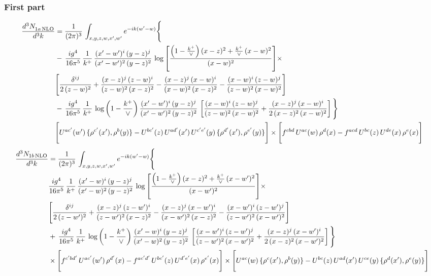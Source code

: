 \documentclass[9pt]{article}
\numberwithin{equation}{section}
\begin{document}
\subsubsection{First part}
\begin{align}
 \frac{d^{3}N_{1a\,\rm NLO}^{\rm}}{d^{3}k}  & =     \frac{1}{(2\pi)^{3}}\,\int_{x,y,z,w,x',w^{\prime}} e^{-ik(w^{\prime}-w)}\Bigg\{\notag \\
& -\, \frac{ig^{4}}{16\pi^{5}}\,\frac{1}{k^{+}}\, \frac{(x'-w')^{i}\,(y-z)^{j}}{(x'-w')^{2}\,(y-z)^{2}}\,\log{\left[\frac{\left(1-\frac{k^{+}}{\vee}\right)(x-z)^{2}+\frac{k^{+}}{\vee}\,(x-w)^{2}}{(x-w)^{2}}\right]}\times\notag \\ &  \Bigg[\frac{\delta^{ij}}{2\,(z-w)^{2}}+\frac{(x-z)^{j}\,(z-w)^{i}}{(z-w)^{2}\,(x-z)^{2}}-\frac{(x-z)^{j}\,(x-w)^{i}}{(x-w)^{2}\,(x-z)^{2}}-\frac{(x-w)^{i}\,(z-w)^{j}}{(z-w)^{2}\,(x-w)^{2}}\Bigg] \notag \\
& -\, \frac{ig^{4}}{16\pi^{5}}\,\frac{1}{k^{+}}\,\log{\left(1-\frac{k^{+}}{\vee}\right)}\,\frac{(x'-w')^{i}\,(y-z)^{j}}{(x'-w')^{2}\,(y-z)^{2}}\,\left[\frac{(x-w)^{i}\,(z-w)^{j}}{(z-w)^{2}\,(x-w)^{2}}+\frac{(x-z)^{j}\,(x-w)^{i}}{2\,(x-z)^{2}\, (x-w)^{2}}\right]\Bigg\} \notag \\ & \Bigg[U^{ac'}(w')\,\{\rho^{c'}(x'),\rho^{b}(y)\}-U^{bc'}(z)\,U^{ad'}(x')\,U^{c'e'}(y)\, \{\rho^{d'}(x'),\rho^{e'}(y)\}\Bigg]\times \Bigg[f^{cbd}\,U^{ac}(w)\,\rho^{d}(x)-f^{acd}\, U^{bc}(z)\,U^{de}(x)\,\rho^{e}(x)\Bigg]
\end{align}
\begin{align}
\frac{d^{3}N_{1b\, \rm NLO}}{d^{3}k} & =  \frac{1}{(2\pi)^{3}}\,\int_{x,y,z,w,x',w^{\prime}} e^{-ik(w^{\prime}-w)}\Bigg\{\notag \\
&  \frac{ig^{4}}{16\pi^{5}}\,\frac{1}{k^{+}}\, \frac{(x'-w)^{i}\,(y-z)^{j}}{(x'-w)^{2}\,(y-z)^{2}}\,\log{\left[\frac{\left(1-\frac{k^{+}}{\vee}\right)(x-z)^{2}+\frac{k^{+}}{\vee}\,(x-w')^{2}}{(x-w')^{2}}\right]}\times\notag \\ &  \Bigg[\frac{\delta^{ij}}{2\,(z-w')^{2}}+\frac{(x-z)^{j}\,(z-w')^{i}}{(z-w')^{2}\,(x-z)^{2}}-\frac{(x-z)^{j}\,(x-w')^{i}}{(x-w')^{2}\,(x-z)^{2}}-\frac{(x-w')^{i}\,(z-w')^{j}}{(z-w')^{2}\,(x-w')^{2}}\Bigg] \notag \\
& +\,\frac{ig^{4}}{16\pi^{5}}\,\frac{1}{k^{+}}\,\log{\left(1-\frac{k^{+}}{\vee}\right)}\,\frac{(x'-w)^{i}\,(y-z)^{j}}{(x'-w)^{2}\,(y-z)^{2}}\,\left[\frac{(x-w')^{i}\,(z-w')^{j}}{(z-w')^{2}\,(x-w')^{2}}+\frac{(x-z)^{j}\,(x-w')^{i}}{2\,(x-z)^{2}\, (x-w')^{2}}\right]\Bigg\} \notag \\ & \times\Bigg[f^{c'bd'}\,U^{ac'}(w')\,\rho^{d'}(x)-f^{ac'd'}\, U^{bc'}(z)\,U^{d'e'}(x)\,\rho^{e'}(x)\Bigg] \times \Bigg[U^{ac}(w)\,\{\rho^{c}(x'),\rho^{b}(y)\}-U^{bc}(z)\,U^{ad}(x')\,U^{ce}(y)\, \{\rho^{d}(x'),\rho^{e}(y)\}\Bigg]
\end{align}
\end{document}
